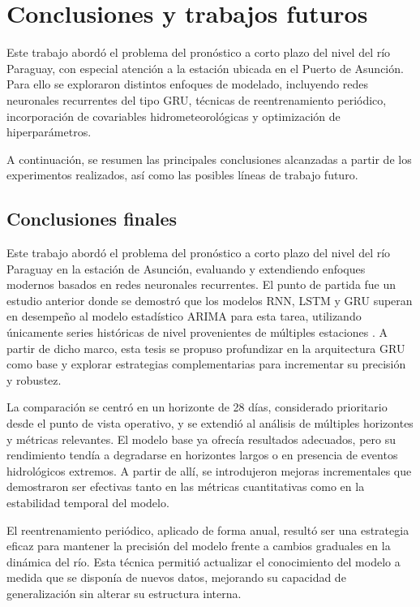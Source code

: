\clearpage
{}
\chapter{Conclusiones y trabajos futuros}
\label{sec:conclusion}

Este trabajo abordó el problema del pronóstico a corto plazo del nivel del río Paraguay, con especial atención a la estación ubicada en el Puerto de Asunción. Para ello se exploraron distintos enfoques de modelado, incluyendo redes neuronales recurrentes del tipo GRU, técnicas de reentrenamiento periódico, incorporación de covariables hidrometeorológicas y optimización de hiperparámetros.

A continuación, se resumen las principales conclusiones alcanzadas a partir de los experimentos realizados, así como las posibles líneas de trabajo futuro.

\section{Conclusiones finales}

Este trabajo abordó el problema del pronóstico a corto plazo del nivel del río Paraguay en la estación de Asunción, evaluando y extendiendo enfoques modernos basados en redes neuronales recurrentes. El punto de partida fue un estudio anterior donde se demostró que los modelos RNN, LSTM y GRU superan en desempeño al modelo estadístico ARIMA para esta tarea, utilizando únicamente series históricas de nivel provenientes de múltiples estaciones \cite{amarilla2023comparative}. A partir de dicho marco, esta tesis se propuso profundizar en la arquitectura GRU como base y explorar estrategias complementarias para incrementar su precisión y robustez.

La comparación se centró en un horizonte de 28 días, considerado prioritario desde el punto de vista operativo, y se extendió al análisis de múltiples horizontes y métricas relevantes. El modelo base ya ofrecía resultados adecuados, pero su rendimiento tendía a degradarse en horizontes largos o en presencia de eventos hidrológicos extremos. A partir de allí, se introdujeron mejoras incrementales que demostraron ser efectivas tanto en las métricas cuantitativas como en la estabilidad temporal del modelo.

El reentrenamiento periódico, aplicado de forma anual, resultó ser una estrategia eficaz para mantener la precisión del modelo frente a cambios graduales en la dinámica del río. Esta técnica permitió actualizar el conocimiento del modelo a medida que se disponía de nuevos datos, mejorando su capacidad de generalización sin alterar su estructura interna.

